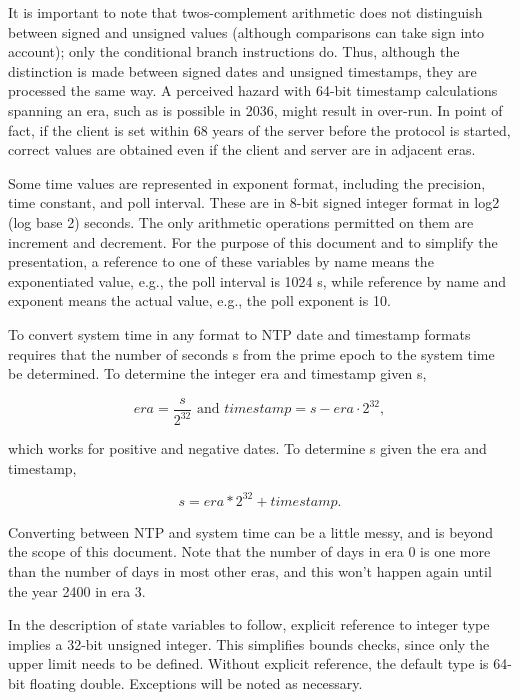 It is important to note that twos-complement arithmetic does not
distinguish between signed and unsigned values (although comparisons
can take sign into account); only the conditional branch instructions
do. Thus, although the distinction is made between signed dates and
unsigned timestamps, they are processed the same way. A perceived
hazard with 64-bit timestamp calculations spanning an era, such as is
possible in 2036, might result in over-run. In point of fact, if the
client is set within 68 years of the server before the protocol is
started, correct values are obtained even if the client and server
are in adjacent eras.

Some time values are represented in exponent format, including the
precision, time constant, and poll interval. These are in 8-bit
signed integer format in log2 (log base 2) seconds. The only
arithmetic operations permitted on them are increment and decrement.
For the purpose of this document and to simplify the presentation, a
reference to one of these variables by name means the exponentiated
value, e.g., the poll interval is 1024 s, while reference by name and
exponent means the actual value, e.g., the poll exponent is 10.

To convert system time in any format to NTP date and timestamp
formats requires that the number of seconds s from the prime epoch to
the system time be determined. To determine the integer era and
timestamp given s,

$$
era = \frac{s}{2^{32}} \text{ and } timestamp = s - era \cdot 2^{32},
$$

which works for positive and negative dates. To determine s given
the era and timestamp,

$$
s = era * 2^{32} + timestamp.
$$

Converting between NTP and system time can be a little messy, and is
beyond the scope of this document. Note that the number of days in
era 0 is one more than the number of days in most other eras, and
this won’t happen again until the year 2400 in era 3.

In the description of state variables to follow, explicit reference
to integer type implies a 32-bit unsigned integer. This simplifies
bounds checks, since only the upper limit needs to be defined.
Without explicit reference, the default type is 64-bit floating
double. Exceptions will be noted as necessary.
